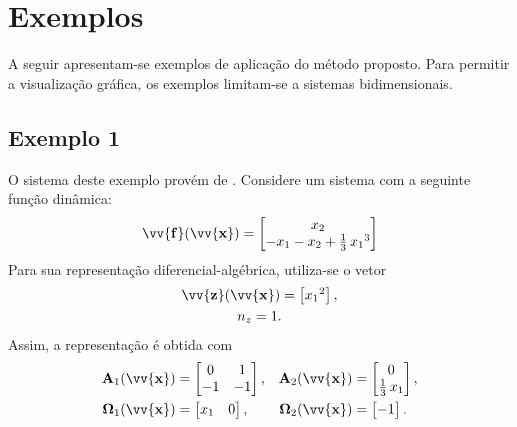 \documentclass{ppgeesa}
\newcommand*{\Prod}{\,}
\newcommand*{\Bold}[1]{\boldsymbol{\mathbf{#1}}}
\newcommand*{\Matr}[1]{\Bold{#1}}
\newcommand*{\Vect}[1]{\vv{\Bold{#1}}}
\begin{document}
\section{Exemplos}

A seguir apresentam-se exemplos de aplicação do método proposto.
Para permitir a visualização gráfica, os exemplos limitam-se a sistemas bidimensionais.

\subsection{Exemplo 1}
O sistema deste exemplo provém de \cite[Exemplo~8.6]{book:Khalil2002}.
Considere um sistema com a seguinte função dinâmica:
\begin{equation}
  \Vect{f}(\Vect{x})
  = \begin{bmatrix}
    x_2
    \\
    -x_1 -x_2 + \frac{1}{3} \Prod {x_1}^3
  \end{bmatrix}
\end{equation}
Para sua representação diferencial-algébrica, utiliza-se o vetor
\begin{gather}
  \Vect{z}(\Vect{x}) = \begin{bmatrix} {x_1}^2 \end{bmatrix}
  ,
  \\
  n_z = 1
  .
\end{gather}
Assim, a representação é obtida com
\begin{align}
  \Matr{A}_1(\Vect{x})
  &= \begin{bmatrix}
     0 &  1 \\
    -1 & -1 \\
  \end{bmatrix}
  ,&
  \Matr{A}_2(\Vect{x})
  &= \begin{bmatrix}
    0                     \\
    \frac{1}{3} \Prod x_1 \\
  \end{bmatrix}
  ,
  \\
  \Matr{\Omega}_1(\Vect{x})
  &= \begin{bmatrix}
    x_1 & 0 \\
  \end{bmatrix}
  ,&
  \Matr{\Omega}_2(\Vect{x})
  &= \begin{bmatrix}
    -1 \\
  \end{bmatrix}
  .
\end{align}
\end{document}
